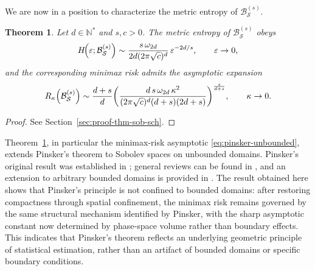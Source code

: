 \documentclass[a4paper,12pt]{article}
\newtheorem{theorem}{Theorem}%
\let\originalleft\left
\let\originalright\right
\renewcommand{\left}{\mathopen{}\mathclose\bgroup\originalleft}
\renewcommand{\right}{\aftergroup\egroup\originalright}
\newcommand{\N}{\mathbb{N}}
\begin{document}
We are now in a position to characterize the metric entropy of
$\mathcal{B}_{\mathcal{S}}^{(s)}$.

\begin{theorem}\label{thm:sob-sch}
Let $d\in\N^*$ and $s,c>0$.
The metric entropy of $\mathcal{B}_{\mathcal{S}}^{(s)}$ obeys
\begin{equation}\label{eq:pinsker-entropy}
    H\!\left(\varepsilon;\mathcal{B}_{\mathcal{S}}^{(s)}\right)
    \sim
    \frac{s\,\omega_{2d}}{2d(2\pi\sqrt{c})^{d}}\,
    \varepsilon^{-2d/s},
    \qquad \varepsilon\to0,
\end{equation}
and the corresponding minimax risk admits the asymptotic expansion
\begin{equation}\label{eq:pinsker-unbounded}
    R_\kappa \left(\mathcal{B}_{\mathcal{S}}^{(s)}\right)
    \sim
    \frac{d+s}{d}
    \left(
        \frac{d\,s\,\omega_{2d}\,\kappa^2}
        {(2\pi\sqrt{c})^{d}(d+s)(2d+s)}
    \right)^{\frac{s}{d+s}},
    \qquad \kappa\to0.
\end{equation}
\end{theorem}

\begin{proof}
    See Section~\ref{sec:proof-thm-sob-sch}.
\end{proof}

\noindent
Theorem~\ref{thm:sob-sch}, in particular the minimax-risk asymptotic
\eqref{eq:pinsker-unbounded}, extends Pinsker’s theorem to Sobolev spaces on
unbounded domains. Pinsker’s original result was established in
\cite{pinsker1980optimal}; general reviews can be found in
\cite{nussbaum1999minimax,johnstone2019estimation,tsybakovIntroductionNonparametricEstimation2009},
and an extension to arbitrary bounded domains is provided in
\cite[Theorem~9]{allard2025metricentropyminimaxrisk}. The result obtained here
shows that Pinsker’s principle is not confined to bounded domains: after
restoring compactness through spatial confinement, the minimax risk remains
governed by the same structural mechanism identified by Pinsker, with the sharp
asymptotic constant now determined by phase-space volume rather than boundary
effects. This indicates that Pinsker’s theorem reflects an underlying geometric
principle of statistical estimation, rather than an artifact of bounded domains
or specific boundary conditions.

\end{document}
